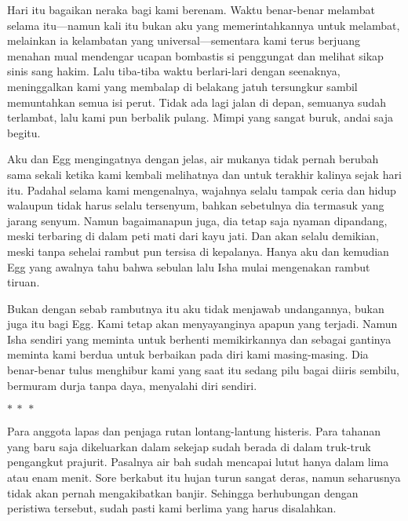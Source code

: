 \documentclass[smalldemyvopaper,11pt,twoside,onecolumn,openright,extrafontsizes]{memoir}
\newcommand\separator{
  \begin{center}
    \(\ast~\ast~\ast\)
  \end{center}
}
\begin{document}

Hari itu bagaikan neraka bagi kami berenam. Waktu benar-benar melambat selama itu---namun kali itu bukan aku yang memerintahkannya untuk melambat, melainkan ia kelambatan yang universal---sementara kami terus berjuang menahan mual mendengar ucapan bombastis si penggungat dan melihat sikap sinis sang hakim. Lalu tiba-tiba waktu berlari-lari dengan seenaknya, meninggalkan kami yang membalap di belakang jatuh tersungkur sambil memuntahkan semua isi perut. Tidak ada lagi jalan di depan, semuanya sudah terlambat, lalu kami pun berbalik pulang. Mimpi yang sangat buruk, andai saja begitu.

Aku dan Egg mengingatnya dengan jelas, air mukanya tidak pernah berubah sama sekali ketika kami kembali melihatnya dan untuk terakhir kalinya sejak hari itu. Padahal selama kami mengenalnya, wajahnya selalu tampak ceria dan hidup walaupun tidak harus selalu tersenyum, bahkan sebetulnya dia termasuk yang jarang senyum. Namun bagaimanapun juga, dia tetap saja nyaman dipandang, meski terbaring di dalam peti mati dari kayu jati. Dan akan selalu demikian, meski tanpa sehelai rambut pun tersisa di kepalanya. Hanya aku dan kemudian Egg yang awalnya tahu bahwa sebulan lalu Isha mulai mengenakan rambut tiruan.


Bukan dengan sebab rambutnya itu aku tidak menjawab undangannya, bukan juga itu bagi Egg. Kami tetap akan menyayanginya apapun yang terjadi. Namun Isha sendiri yang meminta untuk berhenti memikirkannya dan sebagai gantinya meminta kami berdua untuk berbaikan pada diri kami masing-masing. Dia benar-benar tulus menghibur kami yang saat itu sedang pilu bagai diiris sembilu, bermuram durja tanpa daya, menyalahi diri sendiri.

\separator{}


Para anggota lapas dan penjaga rutan lontang-lantung histeris. Para tahanan yang baru saja dikeluarkan dalam sekejap sudah berada di dalam truk-truk pengangkut prajurit. Pasalnya air bah sudah mencapai lutut hanya dalam lima atau enam menit. Sore berkabut itu hujan turun sangat deras, namun seharusnya tidak akan pernah mengakibatkan banjir. Sehingga berhubungan dengan peristiwa tersebut, sudah pasti kami berlima yang harus disalahkan.

\end{document}
